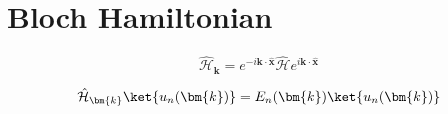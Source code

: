 \section{Bloch Hamiltonian}
\begin{deftcolorbox}[title = Bloch Hamiltonian]
\begin{equation*}
    \hat{\mathcal{H}}_{\bm{k}} = e^{-i\bm{k}\cdot \hat{\bm{x}}} \hat{\mathcal{H}} e^{i\bm{k}\cdot \hat{\bm{x}}}
\end{equation*}
\end{deftcolorbox}
\begin{theotcolorbox}[title = Blochの定理]
\begin{equation*}
    \hat{\mathcal{H}}_{\bm{k}} \ket{u_n (\bm{k})} = E_n(\bm{k}) \ket{u_n(\bm{k})}
\end{equation*}
\end{theotcolorbox}